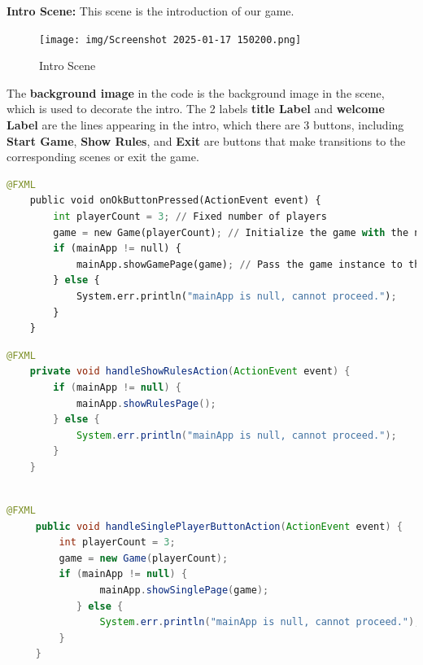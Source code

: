 \documentclass[conference]{IEEEtran}
\begin{document}
\textbf{Intro Scene:}
This scene is the introduction of our game.
\begin{figure}[h!]
    \centering
    \texttt{[image: img/Screenshot 2025-01-17 150200.png]} %
    \caption{Intro Scene}
    \label{fig:intro-scene}
\end{figure}

The \textbf{background image} in the code is the background image in the scene, which is used to decorate the intro. The 2 labels \textbf{title Label} and \textbf{welcome Label} are the lines appearing in the intro, which there are 3 buttons, including \textbf{Start Game}, \textbf{Show Rules}, and \textbf{Exit} are buttons that make transitions to the corresponding scenes or exit the game.

\vspace{2cm}

\begin{lstlisting}[language = Python, caption = Start Game Button, basicstyle=\footnotesize, frame=single, framesep=1pt, framerule=0.5pt, xleftmargin=8pt, xrightmargin=8pt]
    @FXML
    public void onOkButtonPressed(ActionEvent event) {
        int playerCount = 3; // Fixed number of players
        game = new Game(playerCount); // Initialize the game with the number of players
        if (mainApp != null) {
            mainApp.showGamePage(game); // Pass the game instance to the game page
        } else {
            System.err.println("mainApp is null, cannot proceed.");
        }
    }
\end{lstlisting}

\vspace{0.5cm}

\begin{lstlisting}[language = Java, caption= Show Rules Button, frame=single, basicstyle=\footnotesize, framesep=1pt, framerule=0.5pt, xleftmargin=8pt, xrightmargin=8pt]
    @FXML
    private void handleShowRulesAction(ActionEvent event) {
        if (mainApp != null) {
            mainApp.showRulesPage();
        } else {
            System.err.println("mainApp is null, cannot proceed.");
        }
    }
    
\end{lstlisting}

\vspace{0.5cm}

\begin{lstlisting}[language = Java, caption = Single Player Button , basicstyle=\footnotesize, frame=single, framesep=1pt, framerule=0.5pt, xleftmargin=8pt, xrightmargin=8pt ]
    @FXML
     public void handleSinglePlayerButtonAction(ActionEvent event) {
         int playerCount = 3;
         game = new Game(playerCount);
         if (mainApp != null) {
                mainApp.showSinglePage(game);
            } else {
                System.err.println("mainApp is null, cannot proceed.");
         }
     }
\end{lstlisting}
\end{document}
